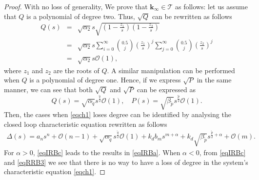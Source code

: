 \documentclass[twoside,reqno,11pt]{fcaa-var} %
\begin{document}
\begin{proof}
	 With no loss of generality, We prove that $\mathbf{k}_\infty\in\mathcal{T}$ as follows: let us assume that $Q$ is a polynomial of degree two. Thus, $\sqrt{Q}$ can be rewritten as follows \cite{Goss2014}
	\begin{eqnarray*}
		Q(s)&=&\sqrt{\alpha_2}s\sqrt{(1-\tfrac{z_1}{s})(1-\tfrac{z_2}{s})}\\ 
		&=&\sqrt{\alpha_2}s\sum_{i=0}^{\infty}\binom{0.5}{j}(\tfrac{z_1}{s})^j\sum_{j=0}^{\infty}\binom{0.5}{j}(\tfrac{z_2}{s})^j\\ 
		&=&\sqrt{\alpha_2}s\mathcal{O}(1),
	\end{eqnarray*}
	where $z_1$ and $z_2$ are the roots of $Q$. A similar manipulation can be performed when $Q$ is a polynomial of degree one. Hence, if we express $\sqrt{P}$
	in the same manner, we can see that both $\sqrt{Q}$ and $\sqrt{P}$ can be expressed as
	\begin{equation}
	Q(s)=\sqrt{\alpha_{\tilde{q}}}s^{\frac{\tilde{q}}{2}}\mathcal{O}(1) , \quad P(s)=\sqrt{\beta_{\tilde{p}}}s^{\frac{\tilde{p}}{2}}\mathcal{O}(1). \label{eqqpa}
	\end{equation}
	Then, the cases when \eqref{eqch1} loses degree can be identified by analysing the closed loop characteristic equation rewritten as follows
	\begin{multline}
	\Delta(s)=a_ns^n +\mathcal{O}(n-1)+\sqrt{\alpha_{\tilde{q}}}s^{\frac{\tilde{q}}{2}}\mathcal{O}(1)+k_db_ms^{m+\alpha}+k_d\sqrt{\beta_{\tilde{p}}}s^{\frac{\tilde{p}}{2}+\alpha}+\mathcal{O}(m). \label{eqIRBc}
	\end{multline}
	For $\alpha>0$, \eqref{eqIRBc} leads to the results in \eqref{eqIRBa}. When $\alpha<0$, from \eqref{eqIRBc} and \eqref{eqRRB3} we see that there is no way to have a loss of degree in the system's characteristic equation \eqref{eqch1}.
\end{proof}
\end{document}
